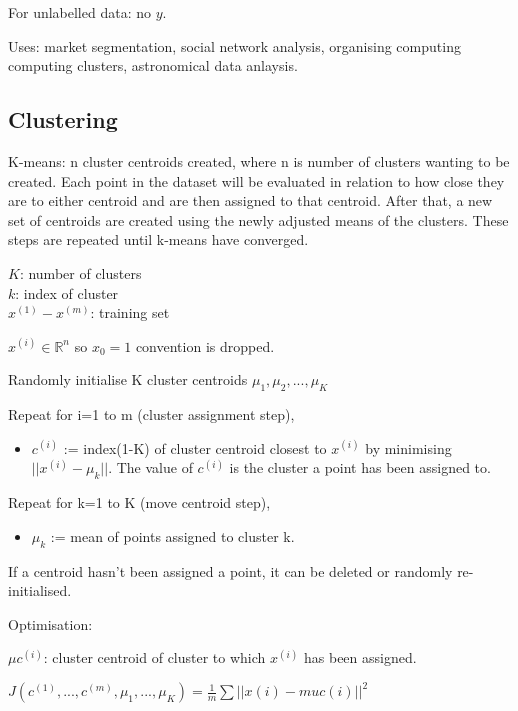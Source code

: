 \documentclass[12pt, a4paper]{article}
\begin{document}
{  For unlabelled data: no $y$.

  Uses: market segmentation, social network analysis, organising computing
  computing clusters, astronomical data anlaysis. 

  \subsection{Clustering}
  
    K-means: n cluster centroids created, where n is number of clusters wanting
    to be created. Each point in the dataset will be evaluated in relation to 
    how close they are to either centroid and are then assigned to that
    centroid. After that, a new set of centroids are created using the newly 
    adjusted means of the clusters. These steps are repeated until k-means
    have converged.
    
    $K$: number of clusters\\
    $k$: index of cluster\\
    $x^{(1)}-x^{(m)}$: training set

    $x^{(i)} \in\mathbb{R}^n$ so $x_0 = 1$ convention is dropped.

    Randomly initialise K cluster centroids $\mu_1,\mu_2,...,\mu_K$

    Repeat for i=1 to m (cluster assignment step), 
    \begin{itemize}
    \vspace{-1em}
      \item $c^{(i)}$ := index(1-K) of cluster centroid closest to $x^{(i)}$ by
            minimising $||x^{(i)} - \mu_k||$. The value of $c^{(i)}$ is the 
            cluster a point has been assigned to.
    \end{itemize}

    Repeat for k=1 to K (move centroid step),
    \begin{itemize}
    \vspace{-1em}
      \item $\mu_k$ := mean of points assigned to cluster k.
    \end{itemize}

    If a centroid hasn't been assigned a point, it can be deleted
    or randomly re-initialised. 

    Optimisation:

    $\mu c^{(i)}$: cluster centroid of cluster to which $x^{(i)}$ has been
    assigned.

    $J(c^{(1)},...,c^{(m)},\mu_1,...,\mu_K) = \frac{1}{m} \sum 
    ||x(i) - muc(i)||^2$

}
\end{document}
